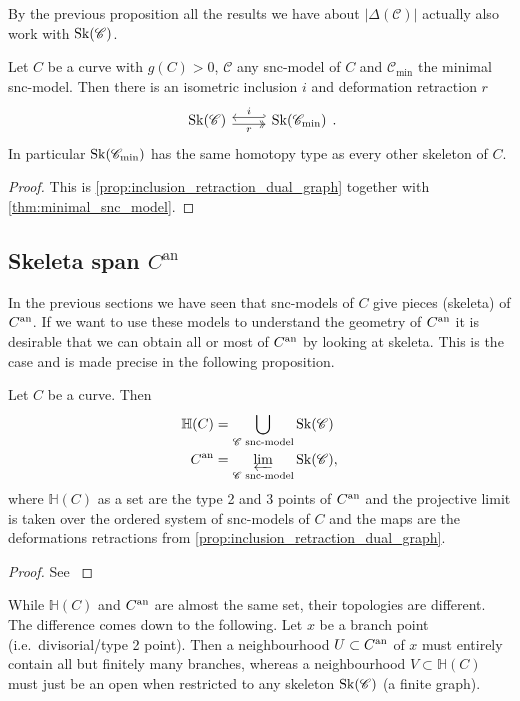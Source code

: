 By the previous proposition all the results we have about $|\Delta(\mathscr C)|$ actually also work with  $\operatorname{Sk}(\mathscr C)$. 

\begin{corollary}
	Let $C$ be a curve with  $g(C) > 0$, $\mathscr C$ any snc-model of $C$ and $\mathscr C_\text{min} $ the minimal snc-model. 
	Then there is an isometric inclusion $i$ and deformation retraction $r$
\[
\begin{tikzcd}
	\sk(\mathscr C ) \rar[hookleftarrow, shift left]{i} \rar[twoheadrightarrow, shift right, ']{r} & \sk(\mathscr C_\text{min} ) 
\end{tikzcd}
.\] 
In particular $\operatorname{Sk}(\mathscr C_\text{min} )$ has the same homotopy type as every other skeleton of $C$. 
\end{corollary}
\begin{proof}
	This is \cref{prop:inclusion_retraction_dual_graph} together with \cref{thm:minimal_snc_model}.
\end{proof}

\subsection{Skeleta span $C^{\mathrm{an}}$} \label{sec:skeleta_span_C_an}

In the previous sections we have seen that snc-models of $C$ give pieces (skeleta) of $C{}^{\text{an}}$. 
If we want to use these models to understand the geometry of $C{}^{\text{an}}$ it is desirable that we can obtain all or most of $C{}^{\text{an}}$ by looking at skeleta. 
This is the case and is made precise in the following proposition. 
\begin{proposition}\label{prop:skeleta_curve_limits}
	Let $C$ be a curve. Then 
	\begin{align*}
		\mathbb H(C) &= \bigcup_{\mathscr C \text{ snc-model}} \operatorname{Sk}(\mathscr C) \\
		C{}^{\text{an}} &= \varprojlim_{\mathscr C \text{ snc-model}} \operatorname{Sk}(\mathscr C)
	,\end{align*}
	where $\mathbb{H}(C)$ as a set are the type 2 and 3 points of $C{}^{\text{an}}$ and the projective limit is taken over the ordered system of snc-models of $C$ and the maps are the deformations retractions from \cref{prop:inclusion_retraction_dual_graph}.
\end{proposition}
\begin{proof}
	See \cite[§2.2.2 and  lem.\ 2.3.2]{bakerWeightFunctionsBerkovich2016}
\end{proof}
\begin{remark}
	While $\mathbb{H}(C)$ and $C{}^{\text{an}}$ are almost the same set, their topologies are different. 
	The difference comes down to the following. 
	Let $x$ be a branch point (i.e.\ divisorial/type 2 point).
	Then a neighbourhood $U \subset C{}^{\text{an}}$ of $x$ must entirely contain all but finitely many branches, whereas a neighbourhood $V \subset \mathbb{H}(C)$ must just be an open when restricted to any skeleton $\operatorname{Sk}(\mathscr C)$ (a finite graph). 
\end{remark}


